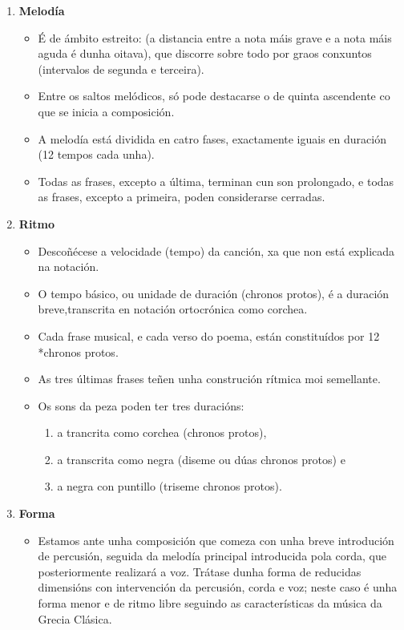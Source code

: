 \begin{enumerate}[1.-]
    \item \textbf{Melodía} \par
        \begin{itemize}
            \item 
            É de ámbito estreito: (a distancia entre a nota máis grave e a nota máis aguda é dunha oitava), que discorre sobre todo por graos conxuntos (intervalos de segunda e terceira).
            \item 
            Entre os saltos melódicos, só pode destacarse o de quinta ascendente co que se inicia a composición. 
            \item 
            A melodía está dividida en catro fases, exactamente iguais en duración (12 tempos cada unha). 
            \item 
            Todas as frases, excepto a última, terminan cun son prolongado, e todas as frases, excepto a primeira, poden considerarse cerradas.
        \end{itemize}
        
    \item \textbf{Ritmo} \par
    \begin{itemize}
        \item 
        Descoñécese a velocidade (tempo) da canción, xa que non está explicada na notación.
        \item 
        O tempo básico, ou unidade de duración (chronos protos), é a duración breve,transcrita en notación ortocrónica como corchea.
        \item
        Cada frase musical, e cada verso do poema, están constituídos por 12 *chronos protos. 
        \item 
        As tres últimas frases teñen unha construción rítmica moi semellante.
        \item
        Os sons da peza poden ter tres duracións: \begin{enumerate}
            \item 
            a trancrita como corchea (chronos protos),
            \item a transcrita como negra (diseme ou dúas chronos protos) e
            \item a negra con puntillo (triseme chronos protos).
            \end{enumerate}
    \end{itemize}

    \item \textbf{Forma} \par
        \begin{itemize}
            \item 
            Estamos ante unha composición que comeza con unha breve introdución de percusión, seguida da melodía principal introducida pola corda, que posteriormente realizará a voz. 
            Trátase dunha forma de reducidas dimensións con intervención da percusión, corda e voz; neste caso é unha forma menor e de ritmo libre seguindo as características da música da Grecia Clásica.
            \par
            

\end{itemize}
\end{enumerate}
